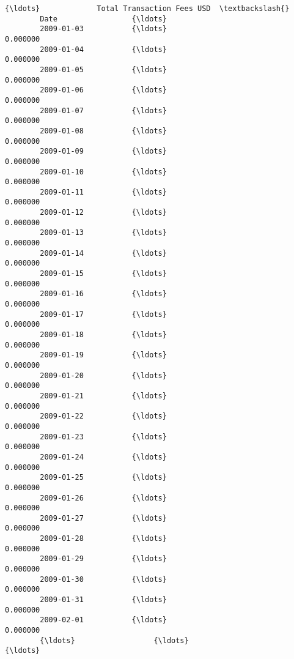 \documentclass[11pt]{article}
\begin{document}
\begin{Verbatim}[commandchars=\\\{\}]
                             {\ldots}             Total Transaction Fees USD  \textbackslash{}
        Date                 {\ldots}                                          
        2009-01-03           {\ldots}                               0.000000   
        2009-01-04           {\ldots}                               0.000000   
        2009-01-05           {\ldots}                               0.000000   
        2009-01-06           {\ldots}                               0.000000   
        2009-01-07           {\ldots}                               0.000000   
        2009-01-08           {\ldots}                               0.000000   
        2009-01-09           {\ldots}                               0.000000   
        2009-01-10           {\ldots}                               0.000000   
        2009-01-11           {\ldots}                               0.000000   
        2009-01-12           {\ldots}                               0.000000   
        2009-01-13           {\ldots}                               0.000000   
        2009-01-14           {\ldots}                               0.000000   
        2009-01-15           {\ldots}                               0.000000   
        2009-01-16           {\ldots}                               0.000000   
        2009-01-17           {\ldots}                               0.000000   
        2009-01-18           {\ldots}                               0.000000   
        2009-01-19           {\ldots}                               0.000000   
        2009-01-20           {\ldots}                               0.000000   
        2009-01-21           {\ldots}                               0.000000   
        2009-01-22           {\ldots}                               0.000000   
        2009-01-23           {\ldots}                               0.000000   
        2009-01-24           {\ldots}                               0.000000   
        2009-01-25           {\ldots}                               0.000000   
        2009-01-26           {\ldots}                               0.000000   
        2009-01-27           {\ldots}                               0.000000   
        2009-01-28           {\ldots}                               0.000000   
        2009-01-29           {\ldots}                               0.000000   
        2009-01-30           {\ldots}                               0.000000   
        2009-01-31           {\ldots}                               0.000000   
        2009-02-01           {\ldots}                               0.000000   
        {\ldots}                  {\ldots}                                    {\ldots}   

\end{Verbatim}
\end{document}
